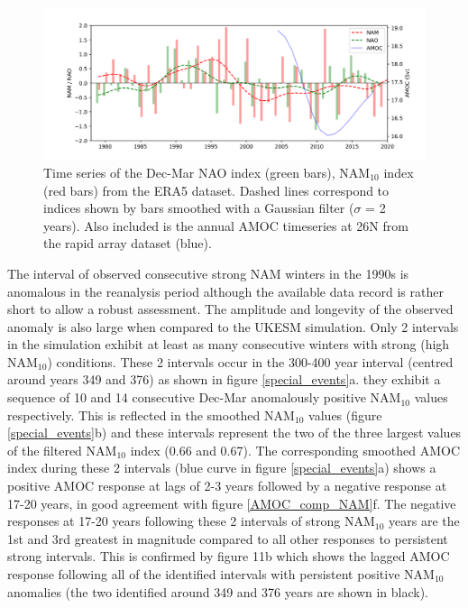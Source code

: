 \begin{figure}[h!]
\begin{center}
\noindent\includegraphics[width = 0.9\linewidth]{Figures/Figures-surface/ERA5_series_allf.png} \caption{Time series of the Dec-Mar NAO index (green bars), NAM$_{10}$ index (red bars) from the ERA5 dataset. Dashed lines correspond to indices shown by bars smoothed with a Gaussian filter ($\sigma$ = 2 years). Also included is the annual AMOC timeseries at 26N from the rapid array dataset (blue).}
\label{ERA5_series}
\end{center}
\end{figure}


The interval of observed consecutive strong NAM winters in the 1990s is anomalous in the reanalysis period  although the available data record is rather short to allow a robust assessment. The amplitude and longevity of the observed anomaly is also large when compared to the UKESM simulation. Only 2 intervals in the simulation exhibit at least as many consecutive winters with strong (high NAM$_{10}$) conditions. These 2 intervals occur in the 300-400 year interval (centred around years 349 and 376) as shown in figure \ref{special_events}a. they exhibit a sequence of 10 and 14 consecutive Dec-Mar anomalously positive NAM$_{10}$ values respectively. This is reflected in the smoothed NAM$_{10}$ values (figure \ref{special_events}b) and these intervals represent the two of the three largest values of the filtered NAM$_{10}$ index (0.66 and 0.67). The corresponding smoothed AMOC index during these 2 intervals (blue curve in figure \ref{special_events}a) shows a positive AMOC response at lags of 2-3 years followed by a negative response at 17-20 years, in good agreement with figure \ref{AMOC_comp_NAM}f. The negative responses at 17-20 years following these 2 intervals of strong NAM$_{10}$ years are the 1st and 3rd greatest in magnitude compared to all other responses to persistent strong intervals. This is confirmed by figure 11b which shows the lagged AMOC response following all of the identified intervals with persistent positive NAM$_{10}$ anomalies (the two identified around 349 and 376 years are shown in black). 

